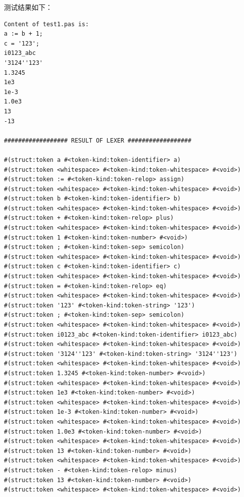 \documentclass[lang=cn]{elegantpaper}
\begin{document}


测试结果如下：

\begin{lstlisting}
Content of test1.pas is:
a := b + 1;
c = '123';
i0123_abc
'3124''123'
1.3245
1e3
1e-3
1.0e3
13
-13

################## RESULT OF LEXER ##################

#(struct:token a #<token-kind:token-identifier> a)
#(struct:token <whitespace> #<token-kind:token-whitespace> #<void>)
#(struct:token := #<token-kind:token-relop> assign)
#(struct:token <whitespace> #<token-kind:token-whitespace> #<void>)
#(struct:token b #<token-kind:token-identifier> b)
#(struct:token <whitespace> #<token-kind:token-whitespace> #<void>)
#(struct:token + #<token-kind:token-relop> plus)
#(struct:token <whitespace> #<token-kind:token-whitespace> #<void>)
#(struct:token 1 #<token-kind:token-number> #<void>)
#(struct:token ; #<token-kind:token-sep> semicolon)
#(struct:token <whitespace> #<token-kind:token-whitespace> #<void>)
#(struct:token c #<token-kind:token-identifier> c)
#(struct:token <whitespace> #<token-kind:token-whitespace> #<void>)
#(struct:token = #<token-kind:token-relop> eq)
#(struct:token <whitespace> #<token-kind:token-whitespace> #<void>)
#(struct:token '123' #<token-kind:token-string> '123')
#(struct:token ; #<token-kind:token-sep> semicolon)
#(struct:token <whitespace> #<token-kind:token-whitespace> #<void>)
#(struct:token i0123_abc #<token-kind:token-identifier> i0123_abc)
#(struct:token <whitespace> #<token-kind:token-whitespace> #<void>)
#(struct:token '3124''123' #<token-kind:token-string> '3124''123')
#(struct:token <whitespace> #<token-kind:token-whitespace> #<void>)
#(struct:token 1.3245 #<token-kind:token-number> #<void>)
#(struct:token <whitespace> #<token-kind:token-whitespace> #<void>)
#(struct:token 1e3 #<token-kind:token-number> #<void>)
#(struct:token <whitespace> #<token-kind:token-whitespace> #<void>)
#(struct:token 1e-3 #<token-kind:token-number> #<void>)
#(struct:token <whitespace> #<token-kind:token-whitespace> #<void>)
#(struct:token 1.0e3 #<token-kind:token-number> #<void>)
#(struct:token <whitespace> #<token-kind:token-whitespace> #<void>)
#(struct:token 13 #<token-kind:token-number> #<void>)
#(struct:token <whitespace> #<token-kind:token-whitespace> #<void>)
#(struct:token - #<token-kind:token-relop> minus)
#(struct:token 13 #<token-kind:token-number> #<void>)
#(struct:token <whitespace> #<token-kind:token-whitespace> #<void>)
\end{lstlisting}
\end{document}
